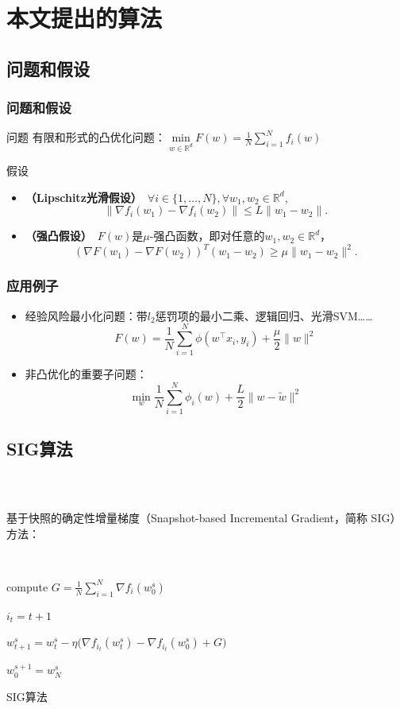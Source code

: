 \section{本文提出的算法}

\subsection{问题和假设}
\frame
{
\frametitle{问题和假设}
\begin{block}{问题}
有限和形式的凸优化问题：
$\underset{w \in \mathbb{R}^d}{\text{min}}\ F(w) = \frac{1}{N}\sum_{i=1}^{N} f_i(w)$
\end{block}

\begin{block}{假设}
\begin{itemize}
    \item \textbf{（Lipschitz光滑假设）}\
    $\forall i \in \{1, \ldots, N\}, \forall w_1, w_2 \in \mathbb{R}^d$,
    $$
    \| \nabla f_i(w_1) - \nabla f_i(w_2) \| \le L \| w_1 - w_2 \|.
    $$

    \item \textbf{（强凸假设）}\
	$F(w)$是$\mu$-强凸函数，即对任意的$w_1, w_2 \in \mathbb{R}^d$，
    $$
	    (\nabla F(w_1) - \nabla F(w_2))^T(w_1 - w_2) \ge \mu \| w_1 - w_2 \|^2.
    $$
\end{itemize}
\end{block}
}

\frame
{
\frametitle{应用例子}
\begin{itemize}
    \item 经验风险最小化问题：带$l_2$惩罚项的最小二乘、逻辑回归、光滑SVM……
    $$
        F(w) = \frac{1}{N}\sum_{i=1}^N\phi(w^\top x_i, y_i) + \frac{\mu}{2}\|w\|^2
    $$
    \item 非凸优化的重要子问题：
    $$
	\min_{w} \frac{1}{N}\sum_{i=1}^{N}\phi_i(w) + \frac{L}{2}\|w - \tilde{w}\|^2
    $$

\end{itemize}
}

\subsection{SIG算法}
\frame
{
\frametitle{\subsecname~ }
基于快照的确定性增量梯度（Snapshot-based Incremental Gradient，简称 SIG）方法：
\begin{algorithm}[H]
\SetKwInOut{Input}{input}
\SetAlgoLined
{} \
{
    compute $G = \frac{1}{N} \sum_{i=1}^{N} \nabla f_i(w_0^s)$ \

    {
    $i_t = t+1$ \


    $w_{t+1}^{s} = w_t^s - \eta \big(\nabla f_{i_t}(w_t^s) - \nabla f_{i_t}(w_0^s) + G \big)$ \

    }
    $w_0^{s+1} = w_N^s$ \
}
\caption{SIG算法}
\end{algorithm}
}

